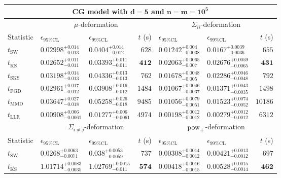 \begin{tabular}{l|llr|llr}
	\toprule
	\multicolumn{7}{c}{{\bf CG model with $\mathbf{d=5}$ and $\mathbf{n=m=10^{5}}$}} \\
	\toprule
	\multicolumn{1}{c}{} & \multicolumn{3}{c}{$\mu$-deformation} & \multicolumn{3}{c}{$\Sigma_{ii}$-deformation} \\
	Statistic & $\epsilon_{95\%\mathrm{CL}}$ & $\epsilon_{99\%\mathrm{CL}}$ & $t$ (s) & $\epsilon_{95\%\mathrm{CL}}$ & $\epsilon_{99\%\mathrm{CL}}$ & $t$ (s) \\
	\midrule
	$t_{\mathrm{SW}}$ & $0.02998_{-0.013}^{+0.014}$ & $0.0404_{-0.012}^{+0.014}$ & $628$ & $0.01242_{-0.0038}^{+0.004}$ & $0.0167_{-0.0036}^{+0.0039}$ & $655$ \\
	$t_{\overline{\mathrm{KS}}}$ & ${\mathbf{0.02652_{-0.011}^{+0.011}}}$ & ${\mathbf{0.03393_{-0.011}^{+0.011}}}$ & ${\mathbf{412}}$ & $0.02063_{-0.007}^{+0.0065}$ & $0.02676_{-0.0065}^{+0.0059}$ & ${\mathbf{431}}$ \\
	$t_{\mathrm{SKS}}$ & $0.03198_{-0.013}^{+0.014}$ & $0.04336_{-0.013}^{+0.013}$ & $762$ & $0.01678_{-0.005}^{+0.0048}$ & $0.02286_{-0.0048}^{+0.0046}$ & $792$ \\
	$t_{\mathrm{FGD}}$ & $0.02961_{-0.012}^{+0.017}$ & $0.03908_{-0.012}^{+0.016}$ & $1484$ & $0.01067_{-0.0037}^{+0.0046}$ & ${\mathbf{0.01371_{-0.0035}^{+0.0043}}}$ & $1498$ \\
	$t_{\mathrm{MMD}}$ & $0.03647_{-0.018}^{+0.027}$ & $0.05258_{-0.018}^{+0.026}$ & $9485$ & ${\mathbf{0.01056_{-0.0051}^{+0.0079}}}$ & $0.01523_{-0.0052}^{+0.0074}$ & $10186$ \\
	$t_{\mathrm{LLR}}$ & $0.00908_{-0.0061}^{+0.006}$ & $0.01277_{-0.0061}^{+0.006}$ & $4974$ & $0.00198_{-0.0012}^{+0.0012}$ & $0.00279_{-0.0012}^{+0.0012}$ & $6312$ \\
	\toprule
	\multicolumn{1}{c}{} & \multicolumn{3}{c}{$\Sigma_{i\neq j}$-deformation} & \multicolumn{3}{c}{$\rm{pow}_{+}$-deformation} \\
	Statistic & $\epsilon_{95\%\mathrm{CL}}$ & $\epsilon_{99\%\mathrm{CL}}$ & $t$ (s) & $\epsilon_{95\%\mathrm{CL}}$ & $\epsilon_{99\%\mathrm{CL}}$ & $t$ (s) \\
	\midrule
	$t_{\mathrm{SW}}$ & $0.0268_{-0.0071}^{+0.0063}$ & $0.038_{-0.0059}^{+0.0053}$ & $737$ & $0.00308_{-0.0012}^{+0.0014}$ & $0.00421_{-0.0012}^{+0.0013}$ & $697$ \\
	$t_{\overline{\mathrm{KS}}}$ & $1.01714_{-0.0035}^{+0.0083}$ & $1.02769_{-0.011}^{+0.0015}$ & ${\mathbf{574}}$ & $0.00418_{-0.0015}^{+0.0016}$ & $0.00528_{-0.0014}^{+0.0015}$ & ${\mathbf{462}}$ \\

\end{tabular}
